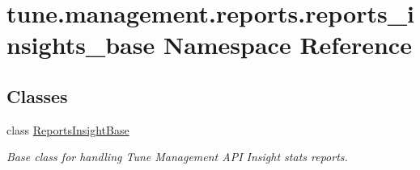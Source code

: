 \hypertarget{namespacetune_1_1management_1_1reports_1_1reports__insights__base}{\section{tune.\-management.\-reports.\-reports\-\_\-insights\-\_\-base Namespace Reference}
\label{namespacetune_1_1management_1_1reports_1_1reports__insights__base}
}
\subsection*{Classes}
\begin{DoxyCompactItemize}
\item 
class \hyperlink{classtune_1_1management_1_1reports_1_1reports__insights__base_1_1ReportsInsightBase}{Reports\-Insight\-Base}
\begin{DoxyCompactList}\small\item\em Base class for handling Tune Management A\-P\-I Insight stats reports. \end{DoxyCompactList}\end{DoxyCompactItemize}
